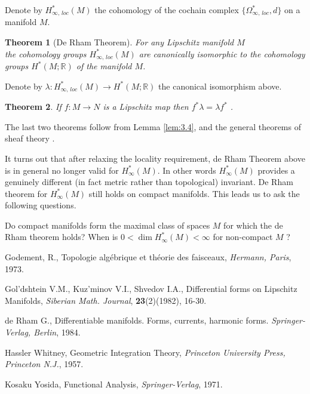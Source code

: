 \documentclass{amsart}%
\newtheorem{thm}{Theorem}[section]
\begin{document}
Denote by $H^*_{\infty,\,loc}(M)$ the cohomology of the cochain
complex $\{\Omega^{*}_{\infty,\,loc},d\}$ on a manifold $M$.
\begin{thm}[De Rham Theorem]
\label{thm:dR} For any Lipschitz manifold $M$\\ the cohomology
groups $H^*_{\infty,\,loc}(M)$ are canonically isomorphic to the
cohomology groups $H^*(M;\mathbb{R})$ of the manifold $M$.
\end{thm}
Denote by $\lambda : H^{*}_{\infty,\,loc}(M)\rightarrow
H^*(M;\mathbb{R})$ the canonical isomorphism above.
\begin{thm}
\label{thm:3.6} If $f: M \rightarrow N$ is a Lipschitz map then
$f^* \lambda=\lambda f^*$ .
\end{thm}
The last two theorems follow from Lemma \ref{lem:3.4}, \cite[Lemma
3.1]{GKS} and the general theorems of sheaf theory \cite[11.4.6,
11.4.16]{G}.

It turns out that after relaxing the locality requirement, de
Rham Theorem %
above is in general no longer valid for $H^{*}_{\infty}(M)$. In
other words $H^*_{\infty}(M)$ provides a genuinely different (in
fact metric rather than topological) invariant. De Rham theorem
for $H^{*}_{\infty}(M)$ still holds on compact manifolds. This
leads us to ask the following questions.

Do compact manifolds form the maximal class of spaces $M$ for
which the de Rham theorem holds? When is $0 < \dim H^*_{\infty}(M)
< \infty$ for non-compact $M$ ?

\begin{thebibliography}{99}

 Godement, R., Topologie alg\'{e}brique et th\'{e}orie des faisceaux,
\textit{Hermann, Paris}, 1973.

 Gol'dshtein V.M., Kuz'minov V.I., Shvedov I.A., Differential forms on Lipschitz
Manifolds, \textit{Siberian Math. Journal}, {\bf 23}(2)(1982),
16-30.

 de Rham G., Differentiable manifolds. Forms, currents, harmonic
forms. \textit{Springer-Verlag, Berlin}, 1984.

 Hassler Whitney, Geometric Integration Theory, \textit{Princeton University Press,\\Princeton N.J.}, 1957.

 Kosaku Yosida, Functional Analysis, \textit{Springer-Verlag}, 1971.

\end{thebibliography}
\end{document}
